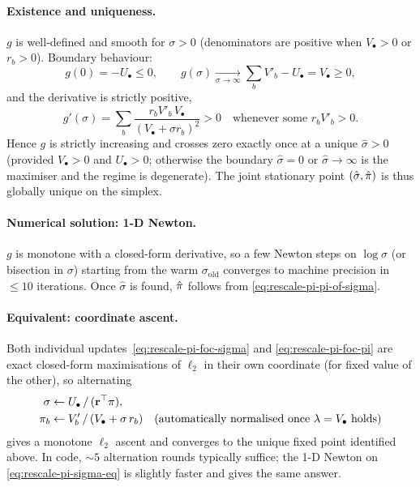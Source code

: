 \paragraph{Existence and uniqueness.}
$g$ is well-defined and smooth for $\sigma > 0$ (denominators are
positive when $V_\bullet > 0$ or $r_b > 0$).  Boundary behaviour:
\[
g(0) = -U_\bullet \le 0,
\qquad
g(\sigma) \xrightarrow[\sigma\to\infty]{} \sum_b V'_b - U_\bullet
= V_\bullet \ge 0,
\]
and the derivative is strictly positive,
\[
g'(\sigma) = \sum_b \frac{r_b V'_b\, V_\bullet}{(V_\bullet + \sigma r_b)^2} > 0
\quad\text{whenever some } r_b V'_b > 0.
\]
Hence $g$ is strictly increasing and crosses zero exactly once at a
unique $\hat\sigma > 0$ (provided $V_\bullet > 0$ and $U_\bullet > 0$;
otherwise the boundary $\hat\sigma = 0$ or $\hat\sigma \to \infty$ is
the maximiser and the regime is degenerate).  The joint stationary
point $(\hat\sigma, \hat{\pi})$ is thus globally unique on the simplex.

\paragraph{Numerical solution: 1-D Newton.}
$g$ is monotone with a closed-form derivative, so a few Newton steps
on $\log\sigma$ (or bisection in $\sigma$) starting from the warm
$\sigma_{\mathrm{old}}$ converges to machine precision in $\le 10$
iterations.  Once $\hat\sigma$ is found, $\hat{\pi}$ follows from
\eqref{eq:rescale-pi-pi-of-sigma}.

\paragraph{Equivalent: coordinate ascent.}
Both individual updates~\eqref{eq:rescale-pi-foc-sigma} and
\eqref{eq:rescale-pi-foc-pi} are exact closed-form maximisations of
$\ell_2$ in their own coordinate (for fixed value of the other),
so alternating
\begin{align*}
\sigma &\leftarrow U_\bullet \,/\, (\mathbf{r}^\top \pi),\\
\pi_b &\leftarrow V'_b \,/\, (V_\bullet + \sigma\, r_b)
\quad (\text{automatically normalised once $\lambda = V_\bullet$ holds})
\end{align*}
gives a monotone $\ell_2$ ascent and converges to the unique fixed
point identified above.  In code, $\sim 5$ alternation rounds
typically suffice; the 1-D Newton on \eqref{eq:rescale-pi-sigma-eq} is
slightly faster and gives the same answer.

